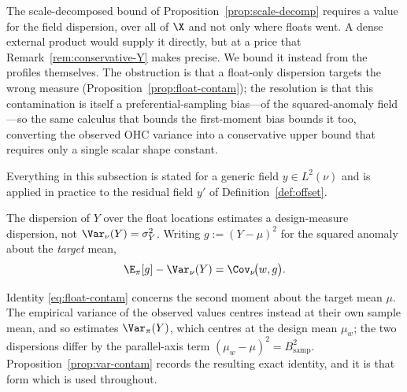 The scale-decomposed bound of Proposition~\ref{prop:scale-decomp}
requires a value for the field dispersion, over all of $\X$ and not only
where floats went. A dense external product would supply it directly,
but at a price that Remark~\ref{rem:conservative-Y} makes precise. We
bound it instead from the profiles themselves. The obstruction is that a
float-only dispersion targets the wrong measure
(Proposition~\ref{prop:float-contam}); the resolution is that this
contamination is itself a preferential-sampling bias---of the
squared-anomaly field---so the same calculus that bounds the
first-moment bias bounds it too, converting the observed OHC variance
into a conservative upper bound that requires only a single scalar shape
constant.

Everything in this subsection is stated for a generic field
$y\in L^2(\nu)$ and is applied in practice to the residual field $y'$ of
Definition~\ref{def:offset}.

\begin{proposition}
\label{prop:float-contam}
The dispersion of $Y$ over the float locations estimates a design-measure
dispersion, not $\Var_\nu(Y)=\sigma_Y^2$. Writing $g:=(Y-\mu)^2$ for the
squared anomaly about the \emph{target} mean,
\begin{equation}
  \E_\pi[g]-\Var_\nu(Y)=\Cov_\nu\!\big(w,g\big).
  \label{eq:float-contam}
\end{equation}
\end{proposition}

Identity \eqref{eq:float-contam} concerns the second moment about the
target mean $\mu$. The empirical variance of the observed values centres
instead at their own sample mean, and so estimates $\Var_\pi(Y)$, which
centres at the design mean $\mu_w$; the two dispersions differ by the
parallel-axis term $(\mu_w-\mu)^2=B_{\mathrm{samp}}^2$.
Proposition~\ref{prop:var-contam} records the resulting exact identity,
and it is that form which is used throughout.


